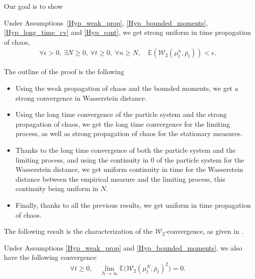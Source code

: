 Our goal is to show
\begin{theorem}\label{unif_prop_chaos_a_partir_de_tout_un_tas_de_proprietes_que_je_ne_vais_pas_donner_parce_que_la_reference_devient_trop_longue_mais_vous_voyez_l_idee}
Under Assumptions~\ref{Hyp_weak_prop}, \ref{Hyp_bounded_moments}, \ref{Hyp_long_time_cv} and \ref{Hyp_cont}, we get strong uniform in time propagation of chaos, \ie
\begin{align*}
\forall \epsilon>0,\ \exists N\geq0,\ \forall t\geq0,\ \forall n\geq N,\quad \mathbb{E}\left(\mathcal{W}_2\left(\mu^n_t,\bar{\rho}_t\right)\right)<\epsilon.
\end{align*}
\end{theorem}

The outline of the proof is the following
\begin{itemize}
\item Using the weak propagation of chaos and the bounded moments, we get a strong convergence in Wasserstein distance.
\item Using the long time convergence of the particle system and the strong propagation of chaos, we get the long time convergence for the limiting process, as well as strong propagation of chaos for the stationary measures.
\item Thanks to the long time convergence of both the particle system and the limiting process, and using the continuity in $0$ of the particle system for the Wasserstein distance, we get uniform continuity in time for the Wasserstein distance between the empirical measure and the limiting process, this continuity being uniform in $N$.
\item Finally, thanks to all the previous results, we get uniform in time propagation of chaos.
\end{itemize}

The following result is the characterization of the $\mathcal{W}_2$-convergence, as given in \cite[Th.\,6.9]{villani2008optimal}.

\begin{lemma}\label{strong_prop}
Under Assumptions \ref{Hyp_weak_prop} and \ref{Hyp_bounded_moments}, we also have the following convergence
\begin{equation}
\forall t\geq0,\quad \lim_{N\to\infty}\mathbb{E}\bigl(\mathcal{W}_2\left(\mu^N_t,\bar{\rho}_t\right)^2\bigr)=0.
\end{equation}
\end{lemma}

